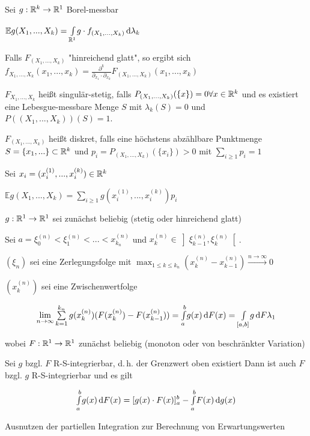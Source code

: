 \documentclass{cheat-sheet}
\newcommand{\E}{\mathbb{E}} %
\begin{document}
Sei $g : \mathbb{R}^k \to \mathbb{R}^1$ Borel-messbar

$\E g(X_1, ..., X_k) = \Int{\R^1}{}{g \cdot f_{(X_1, ..., X_k)}}{\lambda_k}$
 
Falls $F_{(X_1, ..., X_k)}$ "hinreichend glatt", so ergibt sich
$f_{X_1, ..., X_k}(x_1, ..., x_k) = \frac{\partial^k}{\partial_{x_1} \cdot \partial_{x_k}} F_{(X_1, ..., X_k)}(x_1, ..., x_k)$

$F_{X_1, ..., X_k}$ heißt singulär-stetig, falls $P_{(X_1, ..., X_k)}(\{ x \}) = 0 \forall x \in \mathbb{R}^k$
und es existiert eine Lebesgue-messbare Menge $S$ mit $\lambda_k(S) = 0$ und $P((X_1, ..., X_k))(S) = 1$.

$F_{(X_1, ..., X_k)}$ heißt diskret, falls eine höchstens abzählbare Punktmenge $S = \{ x_1, ... \} \subset \mathbb{R}^k$ und $p_i = P_{(X_1, ..., X_k)}(\{ x_i \}) > 0$ mit $\sum_{i \geq 1} p_i = 1$

Sei $x_i = (x_i^{(1)}, ..., x_i^{(k)}) \in \mathbb{R}^k$

$\E g(X_1, ..., X_k) = \sum_{i \geq 1} g(x_i^{(1)}, ..., x_i^{(k)}) p_i$


$g : \mathbb{R}^1 \to \mathbb{R}^1$ sei zunächst beliebig (stetig oder hinreichend glatt)

Sei $a = \xi_0^{(n)} < \xi_1^{(n)} < ... < x_{k_n}^{(n)}$ und $x_k^{(n)} \in \left] \xi_{k-1}^{(n)}, \xi_{k}^{(n)} \right[$.

\begin{defn}
  $(\xi_n)$ sei eine Zerlegungsfolge mit $\max_{1 \leq k \leq k_n} (x_k^{(n)} - x_{k-1}^{(n)}) \xrightarrow{n \to \infty} 0$

  $(x_k^{(n)})$ sei eine Zwischenwertfolge

  \[ \lim_{n \to \infty} \sum_{k=1}^{k_n} g(x_k^{(n)}) (F(x_k^{(n)}) - F(x_{k-1}^{(n)})) = \Int{a}{b}{g(x)}{F(x)} = \Int{[a, b]}{}{g}{F\lambda_1} \]

  wobei $F : \mathbb{R}^1 \to \mathbb{R}^1$ zunächst beliebig (monoton oder von beschränkter Variation)
\end{defn}


Sei $g$ bzgl. $F$ R-S-integrierbar, d.\,h. der Grenzwert oben existiert
Dann ist auch $F$ bzgl. $g$ R-S-integrierbar und es gilt

\[ {\textstyle \int\limits_{a}^{b}} g(x) \,\mathrm{d} F(x) = [g(x) \cdot F(x)]_a^b - {\textstyle \int\limits_{a}^{b}} F(x) \,\mathrm{d} g(x) \]

Ausnutzen der partiellen Integration zur Berechnung von Erwartungswerten
\end{document}

